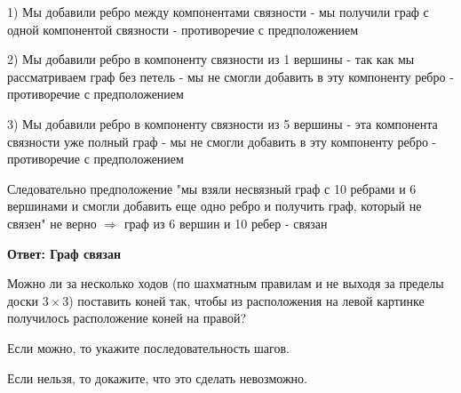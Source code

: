 \documentclass[a4paper,12pt]{article}
\newcounter{z}
\newcommand{\z}{\refstepcounter{z}\vskip 20pt\noindent
\fbox{\textbf{\arabic{z}}} }
\begin{document}
1) Мы добавили ребро между компонентами связности - мы получили граф с одной компонентой связности - противоречие с предположением

2) Мы добавили ребро в компоненту связности из 1 вершины - так как мы рассматриваем граф без петель - мы не смогли добавить в эту компоненту ребро - противоречие с предположением

3) Мы добавили ребро в компоненту связности из 5 вершины - эта компонента связности уже полный граф - мы не смогли добавить в эту компоненту ребро - противоречие с предположением

Следовательно предположение "мы взяли несвязный граф с 10 ребрами и 6 вершинами и смогли добавить еще одно ребро и получить граф, который не связен" не верно $\Rightarrow$ граф из 6 вершин и 10 ребер - связан

\textbf{Ответ: Граф связан}

\z Можно ли за несколько ходов (по шахматным правилам и не выходя за пределы доски $3\times 3$) поставить коней так, чтобы из расположения на левой картинке получилось расположение коней на правой?

Если можно, то укажите последовательность шагов.

Если нельзя, то докажите, что это сделать невозможно.
\end{document}
